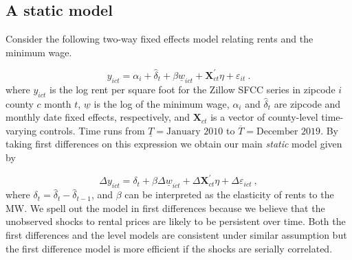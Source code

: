 \subsection{A static model}
Consider the following two-way fixed effects model relating rents and the minimum wage.

\begin{equation*} \label{eq:did_lev}
    y_{ict} = \alpha_i + \hat{\delta}_t 
    		+ \beta \underline{w}_{ict} 
    		+ \mathbf{X}^{'}_{ct}\eta 
    		+ \varepsilon_{it} \ .
\end{equation*}    
where $y_{ict}$ is the log rent per square foot for the Zillow SFCC series in zipcode 
$i$ county $c$ month $t$, $\underline{w}$ is the log of the minimum wage, $\alpha_i$ and 
$\hat{\delta}_t$ are zipcode and monthly date fixed effects, respectively, and 
$\mathbf{X}_{ct}$ is a vector of county-level time-varying controls. Time runs from 
$\underline{T} = \text{January 2010}$ to $\overline{T} = \text{December 2019}$. By taking 
first differences on this expression we obtain our main \textit{static} model given by
    
\begin{equation}\label{eq:did}
	\Delta y_{ict} = \delta_t
				   + \beta \Delta \underline{w}_{ict}
				   + \Delta \mathbf{X}^{'}_{ct} \eta
				   + \Delta \varepsilon_{ict} \ ,
\end{equation}
where $\delta_t = \hat{\delta}_t - \hat{\delta}_{t-1}$, and $\beta$ can be interpreted 
as the elasticity of rents to the MW. We spell out the model in first differences because 
we believe that the unobserved shocks to rental prices are likely to be persistent over 
time. Both the first differences and the level models are consistent under similar assumption 
but the first difference model is more efficient if the shocks are serially correlated.

